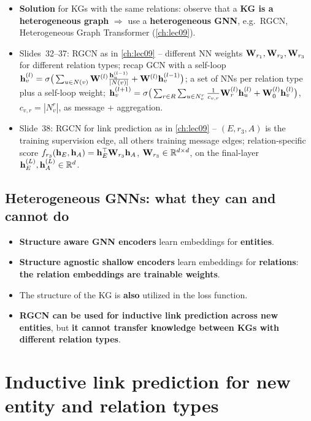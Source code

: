 \begin{itemize}
  \item \textbf{Solution} for KGs with the same relations: observe that a \textbf{KG is a
    heterogeneous graph} $\Rightarrow$ use a \textbf{heterogeneous GNN}, e.g.\ RGCN,
    Heterogeneous Graph Transformer (\cref{ch:lec09}).
  \item Slides~32--37: RGCN as in \cref{ch:lec09} -- different NN weights
    $\mathbf{W}_{r_1},\mathbf{W}_{r_2},\mathbf{W}_{r_3}$ for different relation types; recap GCN with a
    self-loop
    $\mathbf{h}_v^{(l)}=\sigma\big(\sum_{u\in N(v)}\mathbf{W}^{(l)}\frac{\mathbf{h}_u^{(l-1)}}{|N(v)|}+\mathbf{W}^{(l)}\mathbf{h}_v^{(l-1)}\big)$;
    a set of NNs per relation type plus a self-loop weight;
    $\mathbf{h}_v^{(l+1)}=\sigma\big(\sum_{r\in R}\sum_{u\in N_v^r}\frac{1}{c_{v,r}}\mathbf{W}_r^{(l)}\mathbf{h}_u^{(l)}+\mathbf{W}_0^{(l)}\mathbf{h}_v^{(l)}\big)$,
    $c_{v,r}=|N_v^r|$, as message + aggregation.
  \item Slide~38: RGCN for link prediction as in \cref{ch:lec09} -- $(E,r_3,A)$ is the
    training supervision edge, all others training message edges; relation-specific
    score $f_{r_3}(\mathbf{h}_E,\mathbf{h}_A)=\mathbf{h}_E^{\top}\mathbf{W}_{r_3}\mathbf{h}_A$, $\mathbf{W}_{r_3}\in\mathbb{R}^{d\times d}$, on
    the final-layer $\mathbf{h}_E^{(L)},\mathbf{h}_A^{(L)}\in\mathbb{R}^d$.
\end{itemize}

\subsection{Heterogeneous GNNs: what they can and cannot do}\label{sec:lec15-hgnn}

\begin{itemize}
  \item \textbf{Structure aware GNN encoders} learn embeddings for \textbf{entities}.
  \item \textbf{Structure agnostic shallow encoders} learn embeddings for
    \textbf{relations}: \textbf{the relation embeddings are trainable weights}.
  \item The structure of the KG is \textbf{also} utilized in the loss function.
  \item \textbf{RGCN can be used for inductive link prediction across new entities}, but
    \textbf{it cannot transfer knowledge between KGs with different relation types}.
\end{itemize}

\section{Inductive link prediction for new entity and relation types}\label{sec:lec15-newrel}

